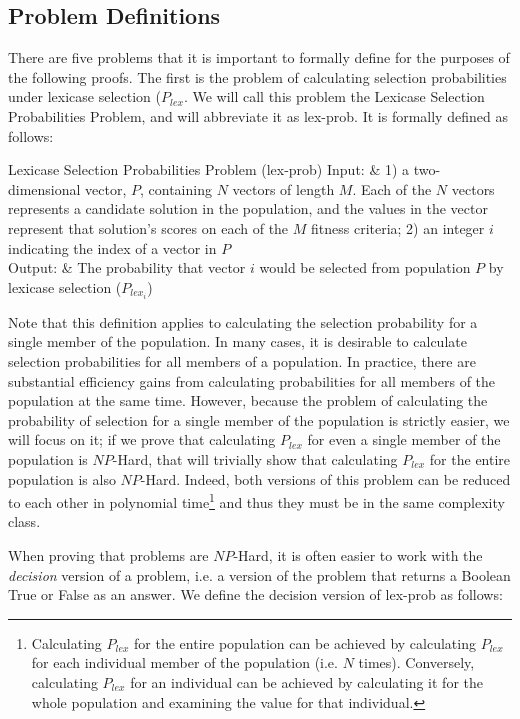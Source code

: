 \documentclass[sigconf]{acmart}
\begin{document}
\subsection{Problem Definitions}

There are five problems that it is important to formally define for the purposes of the following proofs. The first is the problem of calculating selection probabilities under lexicase selection ($P_{lex}$. We will call this problem the {\sc Lexicase Selection Probabilities Problem}, and will abbreviate it as {\sc lex-prob}. It is formally defined as follows:

\begin{problem}[ruled]{Lexicase Selection Probabilities Problem (lex-prob)}
  Input: & 1) a two-dimensional vector, $P$, containing $N$ vectors of length $M$. Each of the $N$ vectors represents a candidate solution in the population, and the values in the vector represent that solution's scores on each of the $M$ fitness criteria; 2) an integer $i$ indicating the index of a vector in $P$ \\
  Output: & The probability that vector $i$ would be selected from population $P$ by lexicase selection ($P_{lex_i}$)\\
\end{problem}

Note that this definition applies to calculating the selection probability for a single member of the population. In many cases, it is desirable to calculate selection probabilities for all members of a population. In practice, there are substantial efficiency gains from calculating probabilities for all members of the population at the same time. However, because the problem of calculating the probability of selection for a single member of the population is strictly easier, we will focus on it; if we prove that calculating $P_{lex}$ for even a single member of the population is $NP$-Hard, that will trivially show that calculating $P_{lex}$ for the entire population is also $NP$-Hard. Indeed, both versions of this problem can be reduced to each other in polynomial time\footnote{Calculating $P_{lex}$ for the entire population can be achieved by calculating $P_{lex}$ for each individual member of the population (i.e. $N$ times). Conversely, calculating $P_{lex}$ for an individual can be achieved by calculating it for the whole population and examining the value for that individual.} and thus they must be in the same complexity class. 

When proving that problems are $NP$-Hard, it is often easier to work with the \textit{decision} version of a problem, i.e. a version of the problem that returns a Boolean True or False as an answer. We define the decision version of {\sc lex-prob} as follows: 
\end{document}
